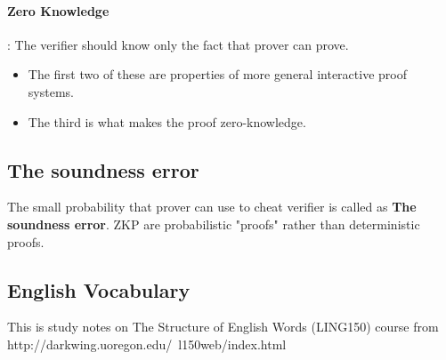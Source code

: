 \documentclass[12pt]{article}
\begin{document}
\paragraph{Zero Knowledge} : The verifier should know only the fact that prover can prove. 

\begin{itemize}
\item The first two of these are properties of more general interactive proof systems. 
\item The third is what makes the proof zero-knowledge.
\end{itemize}

\subsection{The soundness error}
The small probability that prover can use to cheat verifier is called as \textbf{The soundness error}.
ZKP are probabilistic "proofs" rather than deterministic proofs.







%
%

\pagebreak
\vspace*{\fill}
\begin{center}
\section{English Vocabulary}
\end{center}
\vspace*{\fill}
\pagebreak

This is study notes on The Structure of English Words (LING150) course from http://darkwing.uoregon.edu/~l150web/index.html
\end{document}
